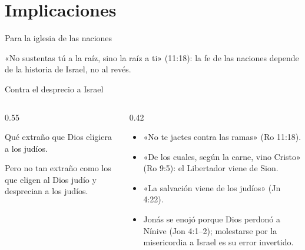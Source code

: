 \section{Implicaciones}
\begin{frame}{Para la iglesia de las naciones}
\centering
{}\par
\elabpropia\vspace{6pt}
\begin{clave}«No sustentas tú a la raíz, sino la raíz a ti» (11:18): la fe de las naciones depende de la historia de Israel, no al revés.\end{clave}
\end{frame}

\begin{frame}{Contra el desprecio a Israel}
\begin{columns}[c,onlytextwidth]
\begin{column}{0.55\textwidth}
\begin{cita}[fontupper=\small\itshape]Qué extraño que Dios eligiera a los judíos.\end{cita}
\begin{cita}[fontupper=\small\itshape]Pero no tan extraño como los que eligen al Dios judío y desprecian a los judíos.\end{cita}
\end{column}
\begin{column}{0.42\textwidth}\scriptsize\RaggedRight
\begin{itemize}
\item «No te jactes contra las ramas» (Ro 11:18).
\item «De los cuales, según la carne, vino Cristo» (Ro 9:5): el Libertador viene de Sion.
\item «La salvación viene de los judíos» (Jn 4:22).
\item Jonás se enojó porque Dios perdonó a Nínive (Jon 4:1--2); molestarse por la misericordia a Israel es su error invertido.
\end{itemize}
\end{column}
\end{columns}
\end{frame}

